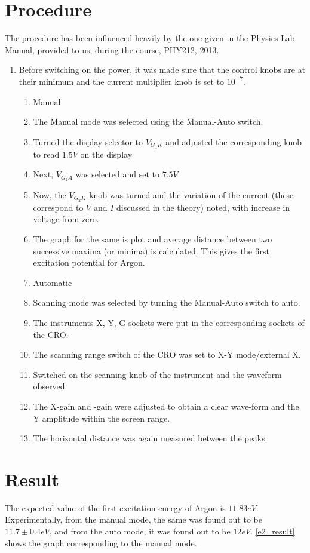 \section{Procedure}
	The procedure has been influenced heavily by the one given in the Physics Lab Manual, provided to us, during the course, PHY212, 2013.
	\begin{enumerate}
		\item Before switching on the power, it was made sure that the control knobs are at their minimum and the current multiplier knob is set to $10^{-7}$.
		\begin{enumerate}
		\item Manual
			\item The Manual mode was selected using the Manual-Auto switch.
			\item Turned the display selector to $V_{G_1K}$ and adjusted the corresponding knob to read $1.5V$ on the display
			\item Next, $V_{G_2A}$ was selected and set to $7.5V$
			\item Now, the $V_{G_2K}$ knob was turned and the variation of the current (these correspond to $V$ and $I$ discussed in the theory) noted, with increase in voltage from zero.
			\item The graph for the same is plot and average distance between two successive maxima (or minima) is calculated. This gives the first excitation potential for Argon.
		\item Automatic
			\item Scanning mode was selected by turning the Manual-Auto switch to auto.
			\item The instruments X, Y, G sockets were put in the corresponding sockets of the CRO.
			\item The scanning range switch of the CRO was set to X-Y mode/external X.
			\item Switched on the scanning knob of the instrument and the waveform observed.
			\item The X-gain and -gain were adjusted to obtain a clear wave-form and the Y amplitude within the screen range.
			\item The horizontal distance was again measured between the peaks.
		\end{enumerate}
	\end{enumerate}

\section{Result}
	The expected value of the first excitation energy of Argon is $11.83 eV$. Experimentally, from the manual mode, the same was found out to be $11.7 \pm 0.4 eV$, and from the auto mode, it was found out to be $12 eV$. \autoref{e2_result} shows the graph corresponding to the manual mode.
